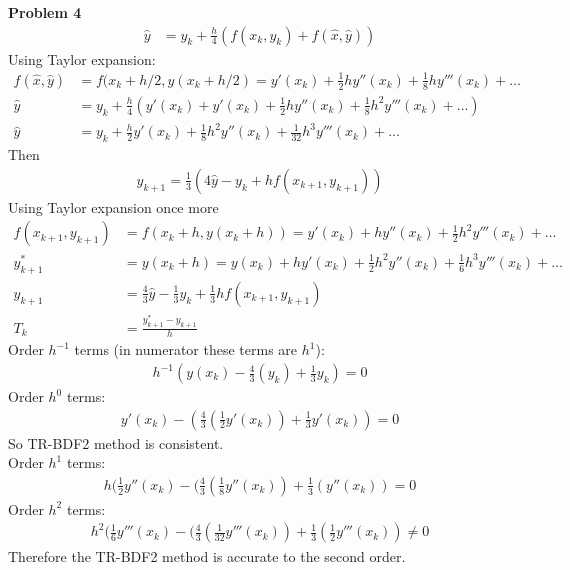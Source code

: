 \documentclass{article} %
\begin{document}
\textbf{Problem 4} 
\begin{align*}
\hat{y} &= y_k + \frac{h}{4}(f(x_k, y_k) + f(\hat{x}, \hat{y}))
\end{align*}
Using Taylor expansion:
\begin{align*}
f(\hat{x}, \hat{y}) &= f(x_k + h/2, y(x_k + h/2) = y'(x_k) + \frac{1}{2}hy''(x_k) + \frac{1}{8}hy'''(x_k) + \hdots \\
\hat{y} &= y_k + \frac{h}{4}(y'(x_k) + y'(x_k) + \frac{1}{2}hy''(x_k) + \frac{1}{8}h^2 y'''(x_k) + \hdots) \\
\hat{y} &= y_k + \frac{h}{2}y'(x_k) + \frac{1}{8}h^2 y''(x_k) + \frac{1}{32}h^3y'''(x_k) + \hdots
\end{align*}
Then
\begin{align*}
y_{k+1} = \frac{1}{3}(4 \hat{y} - y_k + hf(x_{k+1}, y_{k+1}))
\end{align*}
Using Taylor expansion once more
\begin{align*}
f(x_{k+1}, y_{k+1}) &= f(x_k+h, y(x_k+h)) = y'(x_k) + hy''(x_k) + \frac{1}{2}h^2y'''(x_k) + \hdots \\
y_{k+1}^* &= y(x_k+h) = y(x_k) +hy'(x_k) + \frac{1}{2}h^2y''(x_k)+ \frac{1}{6}h^3 y'''(x_k) + \hdots \\
y_{k+1} &= \frac{4}{3}\hat{y} - \frac{1}{3}y_k + \frac{1}{3}hf(x_{k+1}, y_{k+1}) \\
T_k &= \frac{y_{k+1}^* - y_{k+1}}{h}
\end{align*}
Order $h^{-1}$ terms (in numerator these terms are $h^1$):
\begin{align*}
h^{-1}(y(x_k) - \frac{4}{3}(y_k) + \frac{1}{3}y_k) = 0
\end{align*}
Order $h^0$ terms:
\begin{align*}
y'(x_k) - (\frac{4}{3}(\frac{1}{2}y'(x_k)) + \frac{1}{3}y'(x_k)) = 0
\end{align*}
So TR-BDF2 method is consistent. \\
Order $h^1$ terms:
\begin{align*}
h(\frac{1}{2}y''(x_k) - (\frac{4}{3}(\frac{1}{8}y''(x_k)) +\frac{1}{3}(y''(x_k))=0
\end{align*}
Order $h^2$ terms:
\begin{align*}
h^2(\frac{1}{6}y'''(x_k) - (\frac{4}{3}(\frac{1}{32}y'''(x_k)) +\frac{1}{3}(\frac{1}{2}y'''(x_k)) \neq 0
\end{align*}
Therefore the TR-BDF2 method is accurate to the second order.
\\
\end{document}
